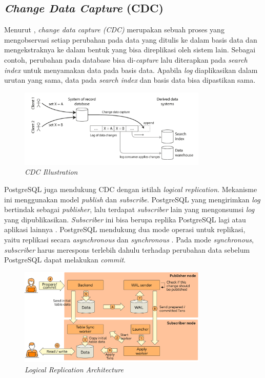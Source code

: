 \subsection{\textit{Change Data Capture} (CDC)}

Menurut \cite{dataIntensiveApplications}, \textit{change data capture (CDC)} merupakan sebuah proses yang mengobservasi setiap perubahan pada data yang ditulis ke dalam basis data dan mengekstraknya ke dalam bentuk yang bisa direplikasi oleh sistem lain. Sebagai contoh, perubahan pada database bisa di-\textit{capture} lalu diterapkan pada \textit{search index} untuk menyamakan data pada basis data. Apabila \textit{log} diaplikasikan dalam urutan yang sama, data pada \textit{search index} dan basis data bisa dipastikan sama.

\begin{figure}[ht]
    \centering
    \includegraphics[width=0.8\textwidth]{resources/chapter-2/cdc.png}
    \caption{\textit{CDC Illustration \parencite{dataIntensiveApplications}}}
    \label{fig:cdc-illustration}
\end{figure}

PostgreSQL juga mendukung CDC dengan istilah \textit{logical replication}. Mekanisme ini menggunakan model \textit{publish} dan \textit{subscribe}. PostgreSQL yang mengirimkan \textit{log} bertindak sebagai \textit{publisher}, lalu terdapat \textit{subscriber} lain yang mengonsumsi \textit{log} yang dipublikasikan. \textit{Subscriber} ini bisa berupa replika PostgreSQL lagi atau aplikasi lainnya \parencite{pgLogicalReplication}. PostgreSQL mendukung dua mode operasi untuk replikasi, yaitu replikasi secara \textit{asynchronous} dan \textit{synchronous} \parencite{insideLogicalReplication}. Pada mode \textit{synchronous}, \textit{subscriber} harus merespons terlebih dahulu terhadap perubahan data sebelum PostgreSQL dapat melakukan \textit{commit}.

\begin{figure}[ht]
    \centering
    \includegraphics[width=0.8\textwidth]{resources/chapter-2/postgres-logical-replication.png}
    \caption{\textit{Logical Replication Architecture \parencite{insideLogicalReplication}}}
    \label{fig:logical-replication-architecture}
\end{figure}

